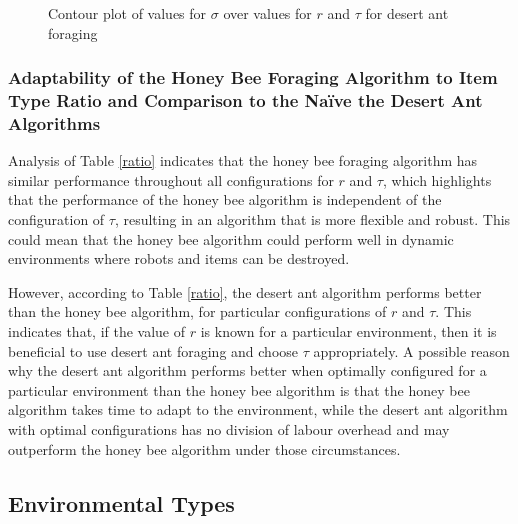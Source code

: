 \begin{figure}[!htb]
\centering
\resizebox{0.8\textwidth}{!}{}
\caption{Contour plot of values for $\sigma$ over values for $r$ and $\tau$ for desert ant foraging}
\label{desertantplot}
\end{figure}


%


\subsubsection{Adaptability of the Honey Bee Foraging Algorithm to Item Type Ratio and Comparison to the Na\"ive the Desert Ant Algorithms}
\label{Adaptability}
Analysis of Table \ref{ratio} indicates that the honey bee foraging algorithm has similar performance throughout all configurations for $r$ and $\tau$, which highlights that the performance of the honey bee algorithm is independent of the configuration of $\tau$, resulting in an algorithm that is more flexible and robust. This could mean that the honey bee algorithm could perform well in dynamic environments where robots and items can be destroyed.

However, according to Table \ref{ratio}, the desert ant algorithm performs better than the honey bee algorithm, for particular configurations of $r$ and $\tau$. This indicates that, if the value of $r$ is known for a particular environment, then it is beneficial to use desert ant foraging and choose $\tau$ appropriately. A possible reason why the desert ant algorithm performs better when optimally configured for a particular environment than the honey bee algorithm is that the honey bee algorithm takes time to adapt to the environment, while the desert ant algorithm with optimal configurations has no division of labour overhead and may outperform the honey bee algorithm under those circumstances.

\subsection{Environmental Types}
\label{results:environmentaltypes}

